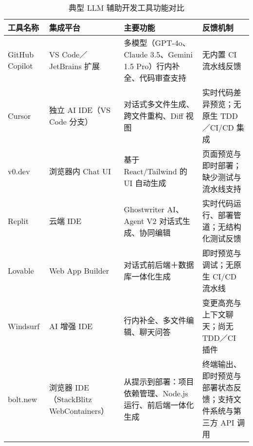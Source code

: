 \begin{table}[H]
  \centering
  \footnotesize
  \caption{典型 LLM 辅助开发工具功能对比}
  \label{tab:llm-tools-updated}
  \setlength{\tabcolsep}{3pt}
  \begin{tabular}{
    >{\raggedright\arraybackslash}p{2.4cm}
    >{\raggedright\arraybackslash}p{2.6cm}
    >{\raggedright\arraybackslash}p{3.6cm}
    >{\raggedright\arraybackslash}p{4.6cm}
  }
    \toprule
    \textbf{工具名称} & \textbf{集成平台} & \textbf{主要功能} & \textbf{反馈机制} \\
    \midrule
    GitHub Copilot\cite{copilotx2023}      & VS Code／JetBrains 扩展        & 多模型（GPT-4o、Claude 3.5、Gemini 1.5 Pro）行内补全、代码审查支持      & 无内置 CI 流水线反馈                                \\
    \addlinespace
    Cursor\cite{cursor2025wiki}            & 独立 AI IDE（VS Code 分支）    & 对话式多文件生成、跨文件重构、Diff 视图              & 实时代码差异预览；无原生 TDD／CI/CD 集成            \\
    \addlinespace
    v0.dev\cite{v0dev2024}                 & 浏览器内 Chat UI               & 基于 React/Tailwind 的 UI 自动生成                  & 页面预览与即时部署；缺少测试与流水线支持            \\
    \addlinespace
    Replit\cite{replit2025wiki}            & 云端 IDE                       & Ghostwriter AI、Agent V2 对话式生成、协同编辑       & 实时代码运行、部署管道；无结构化测试反馈            \\
    \addlinespace
    Lovable\cite{lovable2025times}         & Web App Builder                & 对话式前后端＋数据库一体化生成                      & 即时预览与调试；无原生 CI/CD 流水线                \\
    \addlinespace
    Windsurf\cite{windsurf2024}            & AI 增强 IDE                    & 行内补全、多文件编辑、聊天问答                      & 变更高亮与上下文聊天；尚无 TDD／CI 插件            \\
    \addlinespace
    bolt.new\cite{arunachalam2024boltnew,boltnewgithub2024} & 浏览器 IDE（StackBlitz WebContainers） & 从提示到部署：项目依赖管理、Node.js 运行、前后端一体化生成 & 终端输出、即时预览与部署状态反馈；支持文件系统与第三方 API 调用 \\
    \bottomrule
  \end{tabular}
\end{table}

